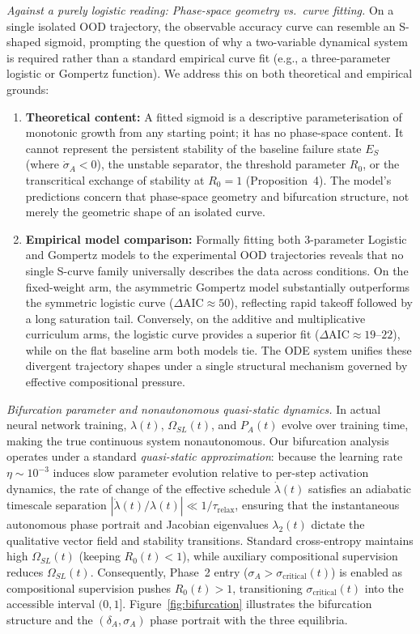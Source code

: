\documentclass{article}
\theoremstyle{definition}
\begin{document}
\noindent\emph{Against a purely logistic reading: Phase-space geometry vs.\ curve fitting.} On a single isolated OOD trajectory, the observable accuracy curve can resemble an S-shaped sigmoid, prompting the question of why a two-variable dynamical system is required rather than a standard empirical curve fit (e.g., a three-parameter logistic or Gompertz function). We address this on both theoretical and empirical grounds:
\begin{enumerate}[nosep]
\item \textbf{Theoretical content:} A fitted sigmoid is a descriptive parameterisation of monotonic growth from any starting point; it has no phase-space content. It cannot represent the persistent stability of the baseline failure state $E_S$ (where $\dot{\sigma}_A < 0$), the unstable separator, the threshold parameter $R_0$, or the transcritical exchange of stability at $R_0 = 1$ (Proposition~4). The model's predictions concern that phase-space geometry and bifurcation structure, not merely the geometric shape of an isolated curve.
\item \textbf{Empirical model comparison:} Formally fitting both 3-parameter Logistic and Gompertz models to the experimental OOD trajectories reveals that no single S-curve family universally describes the data across conditions. On the fixed-weight arm, the asymmetric Gompertz model substantially outperforms the symmetric logistic curve ($\Delta\text{AIC} \approx 50$), reflecting rapid takeoff followed by a long saturation tail. Conversely, on the additive and multiplicative curriculum arms, the logistic curve provides a superior fit ($\Delta\text{AIC} \approx 19\text{--}22$), while on the flat baseline arm both models tie. The ODE system unifies these divergent trajectory shapes under a single structural mechanism governed by effective compositional pressure.
\end{enumerate}

\noindent\emph{Bifurcation parameter and nonautonomous quasi-static dynamics.} In actual neural network training, $\lambda(t)$, $\Omega_{SL}(t)$, and $P_A(t)$ evolve over training time, making the true continuous system nonautonomous. Our bifurcation analysis operates under a standard \emph{quasi-static approximation}: because the learning rate $\eta \sim 10^{-3}$ induces slow parameter evolution relative to per-step activation dynamics, the rate of change of the effective schedule $\dot{\lambda}(t)$ satisfies an adiabatic timescale separation $|\dot{\lambda}(t)/\lambda(t)| \ll 1/\tau_{\text{relax}}$, ensuring that the instantaneous autonomous phase portrait and Jacobian eigenvalues $\lambda_2(t)$ dictate the qualitative vector field and stability transitions. Standard cross-entropy maintains high $\Omega_{SL}(t)$ (keeping $R_0(t) < 1$), while auxiliary compositional supervision reduces $\Omega_{SL}(t)$. Consequently, Phase~2 entry ($\sigma_A > \sigma_{\text{critical}}(t)$) is enabled as compositional supervision pushes $R_0(t) > 1$, transitioning $\sigma_{\text{critical}}(t)$ into the accessible interval $(0, 1]$.
Figure~\ref{fig:bifurcation} illustrates the bifurcation structure and the $(\delta_A, \sigma_A)$ phase portrait with the three equilibria.
\end{document}
